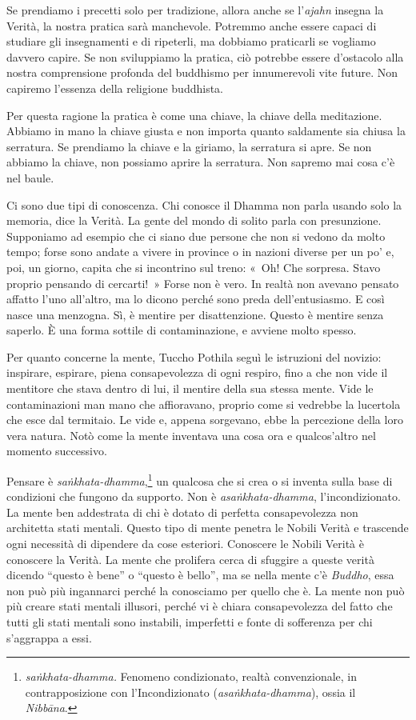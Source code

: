 Se prendiamo i precetti solo per tradizione, allora anche se
l'\emph{ajahn} insegna la Verità, la nostra pratica sarà manchevole.
Potremmo anche essere capaci di studiare gli insegnamenti e di
ripeterli, ma dobbiamo praticarli se vogliamo davvero capire. Se non
sviluppiamo la pratica, ciò potrebbe essere d'ostacolo alla nostra
comprensione profonda del buddhismo per innumerevoli vite future. Non
capiremo l'essenza della religione buddhista.

Per questa ragione la pratica è come una chiave, la chiave della
meditazione. Abbiamo in mano la chiave giusta e non importa quanto
saldamente sia chiusa la serratura. Se prendiamo la chiave e la giriamo,
la serratura si apre. Se non abbiamo la chiave, non possiamo aprire la
serratura. Non sapremo mai cosa c'è nel baule.

Ci sono due tipi di conoscenza. Chi conosce il Dhamma non parla usando
solo la memoria, dice la Verità. La gente del mondo di solito parla con
presunzione. Supponiamo ad esempio che ci siano due persone che non si
vedono da molto tempo; forse sono andate a vivere in province o in
nazioni diverse per un po' e, poi, un giorno, capita che si incontrino
sul treno: «~Oh! Che sorpresa. Stavo proprio pensando di cercarti!~»
Forse non è vero. In realtà non avevano pensato affatto l'uno all'altro,
ma lo dicono perché sono preda dell'entusiasmo. E così nasce una
menzogna. Sì, è mentire per disattenzione. Questo è mentire senza
saperlo. È una forma sottile di contaminazione, e avviene molto spesso.

Per quanto concerne la mente, Tuccho Pothila seguì le istruzioni del
novizio: inspirare, espirare, piena consapevolezza di ogni respiro, fino
a che non vide il mentitore che stava dentro di lui, il mentire della
sua stessa mente. Vide le contaminazioni man mano che affioravano,
proprio come si vedrebbe la lucertola che esce dal termitaio. Le vide e,
appena sorgevano, ebbe la percezione della loro vera natura. Notò come
la mente inventava una cosa ora e qualcos'altro nel momento successivo.

Pensare è \emph{saṅkhata-dhamma},\footnote{\emph{saṅkhata-dhamma.}
  Fenomeno condizionato, realtà convenzionale, in contrapposizione con
  l'Incondizionato (\emph{asaṅkhata-dhamma}), ossia il \emph{Nibbāna}.}
un qualcosa che si crea o si inventa sulla base di condizioni che
fungono da supporto. Non è \emph{asaṅkhata-dhamma}, l'incondizionato. La
mente ben addestrata di chi è dotato di perfetta consapevolezza non
architetta stati mentali. Questo tipo di mente penetra le Nobili Verità
e trascende ogni necessità di dipendere da cose esteriori. Conoscere le
Nobili Verità è conoscere la Verità. La mente che prolifera cerca di
sfuggire a queste verità dicendo ``questo è bene'' o ``questo è bello'',
ma se nella mente c'è \emph{Buddho}, essa non può più ingannarci perché
la conosciamo per quello che è. La mente non può più creare stati
mentali illusori, perché vi è chiara consapevolezza del fatto che tutti
gli stati mentali sono instabili, imperfetti e fonte di sofferenza per
chi s'aggrappa a essi.

